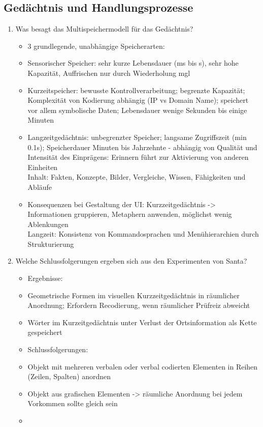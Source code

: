 \subsection{Gedächtnis und Handlungsprozesse}
\begin{enumerate}
	\item Was besagt das Multispeichermodell für das Gedächtnis?
	\begin{itemize}
		\item 3 grundlegende, unabhängige Speicherarten:
		\item Sensorischer Speicher: sehr kurze Lebensdauer (ms bis s), sehr hohe Kapazität, Auffrischen nur durch Wiederholung mgl
		\item Kurzeitspeicher: bewusste Kontrollverarbeitung; begrenzte Kapazität; Komplexität von Kodierung abhängig (IP vs Domain Name); speichert vor allem symbolische Daten; Lebensdauer wenige Sekunden bis einige Minuten
		\item Langzeitgedächtnis: unbegrenzter Speicher; langsame Zugriffszeit (min 0.1s); Speicherdauer Minuten bis Jahrzehnte - abhängig von Qualität und Intensität des Einprägens: Erinnern führt zur Aktivierung von anderen Einheiten\\
		Inhalt: Fakten, Konzepte, Bilder, Vergleiche, Wissen, Fähigkeiten und Abläufe
		\item Konsequenzen bei Gestaltung der UI: Kurzzeitgedächtnis -> Informationen gruppieren, Metaphern anwenden, möglichst wenig Ablenkungen\\
		Langzeit: Konsistenz von Kommandosprachen und Menühierarchien durch Strukturierung
	\end{itemize}
	
	\item Welche Schlussfolgerungen ergeben sich aus den Experimenten von
	Santa?
	\begin{itemize}
		\item Ergebnisse:
		\item Geometrische Formen im visuellen Kurzzeitgedächtnis in räumlicher Anordnung; Erfordern Recodierung, wenn räumlicher Prüfreiz abweicht
		\item Wörter im Kurzeitgedächtnis unter Verlust der Ortsinformation als Kette gespeichert
		\item Schlussfolgerungen:
		\item Objekt mit mehreren verbalen oder verbal codierten Elementen in Reihen (Zeilen, Spalten) anordnen
		\item Objekt aus grafischen Elementen -> räumliche Anordnung bei jedem Vorkommen sollte gleich sein
		\item 
	\end{itemize}
	

\end{enumerate}
